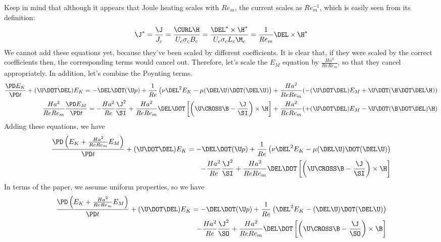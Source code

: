 \documentclass[11pt]{article}
\begin{document}
Keep in mind that although it appears that Joule heating scales with $Re_m$, the current scales as $Re_m^{-1}$, which is easily seen from its definition:
\begin{equation}
	\J^* = \frac{\J}{J_c} = \frac{\CURL \H}{U_c \sigma_c B_c} = \frac{\DEL^* \times \H^*}{U_c \sigma_c L_c \M_c} = \frac{1}{Re_m} \DEL \times \H^*
\end{equation}
We cannot add these equations yet, because they've been scaled by different coefficients. It is clear that, if they were scaled by the correct coefficients then, the corresponding terms would cancel out. Therefore, let's scale the $E_M$ equation by $\frac{Ha^2}{Re Re_m}$, so that they cancel appropriately. In addition, let's combine the Poynting terms.
\begin{equation}\begin{aligned}
	\frac{\PD E_K}{\PD t}
	+ (\U \DOT \DEL) E_K
	= 
	- \DEL \DOT (\U p)
	+ \frac{1}{Re} \left( \nu \DEL^2 E_K -  \mu (\DEL \U) \DOT (\DEL \U) \right)
	+ \frac{Ha^2}{Re Re_m} (  - (\U \DOT \DEL) E_M + \U \DOT (\B \DOT \DEL \H) )
	\\
	\frac{Ha^2}{Re Re_m} \frac{\PD E_M}{\PD t} = 
	- \frac{Ha^2}{Re} \frac{\J^2}{\SI}
	+ \frac{Ha^2}{Re Re_m} \DEL \DOT \left[\left(\U \CROSS \B - \frac{\J}{\SI} \right) \times \H \right]
	+ \frac{Ha^2}{Re Re_m} ( + (\U \DOT \DEL) E_M - \U \DOT (\B \DOT \DEL) \H )
\end{aligned}\end{equation}
Adding these equations, we have
\begin{equation}\begin{aligned}
	\frac{\PD \left( E_K + \frac{Ha^2}{Re Re_m} E_M \right)}{\PD t}
	+ (\U \DOT \DEL) E_K
	= 
	- \DEL \DOT (\U p)
	+ \frac{1}{Re} \left( \nu \DEL^2 E_K -  \mu (\DEL \U) \DOT (\DEL \U) \right) \\
	- \frac{Ha^2}{Re} \frac{\J^2}{\SI}
	+ \frac{Ha^2}{Re Re_m} \DEL \DOT \left[\left(\U \CROSS \B - \frac{\J}{\SI} \right) \times \H \right]
\end{aligned}\end{equation}
In terms of the paper, we assume uniform properties, so we have
\begin{equation}\begin{aligned}
	\frac{\PD \left( E_K + \frac{Ha^2}{Re Re_m} E_M \right)}{\PD t}
	+ (\U \DOT \DEL) E_K
	= 
	- \DEL \DOT (\U p)
	+ \frac{1}{Re} \left( \DEL^2 E_K - (\DEL \U) \DOT (\DEL \U) \right) \\
	- \frac{Ha^2}{Re} \frac{\J^2}{\SO}
	+ \frac{Ha^2}{Re Re_m} \DEL \DOT \left[\left(\U \CROSS \B - \frac{\J}{\SO} \right) \times \B \right]
\end{aligned}\end{equation}
\end{document}
